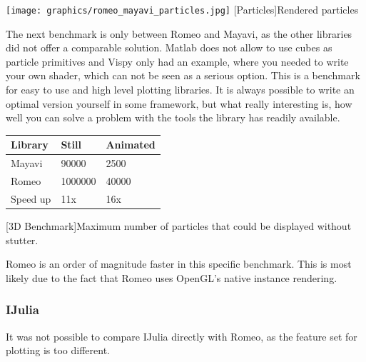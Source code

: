 \begin{minipage}{\linewidth}
    \centering
    \texttt{[image: graphics/romeo\_mayavi\_particles.jpg]}
    [Particles]{Rendered particles}
    \label{fig:reactive1}
\end{minipage}

The next benchmark is only between Romeo and Mayavi, as the other libraries did not offer a comparable solution. Matlab does not allow to use cubes as particle primitives and Vispy only had an example, where you needed to write your own shader, which can not be seen as a serious option. This is a benchmark for easy to use and high level plotting libraries. It is always possible to write an optimal version yourself in some framework, but what really interesting is, how well you can solve a problem with the tools the library has readily available.

\begin{table}[htbp]
    \centering
    \begin{tabular}{l|l|l}
        \hline
        \textbf{Library} & \textbf{Still}  & \textbf{Animated}  \\ 
        \hline
        Mayavi           & 90000           & 2500  \\
        Romeo            & 1000000         & 40000 \\
        \hline
        \hline
        Speed up         & 11x             & 16x \\
    \end{tabular}
    [3D Benchmark]{Maximum number of particles that could be displayed without stutter.}
    \label{table:relativespeedoglw}
\end{table}
Romeo is an order of magnitude faster in this specific benchmark. This is most likely due to the fact that Romeo uses OpenGL's native instance rendering.


\subsubsection{IJulia}

It was not possible to compare IJulia directly with Romeo, as the feature set for plotting is too different.


